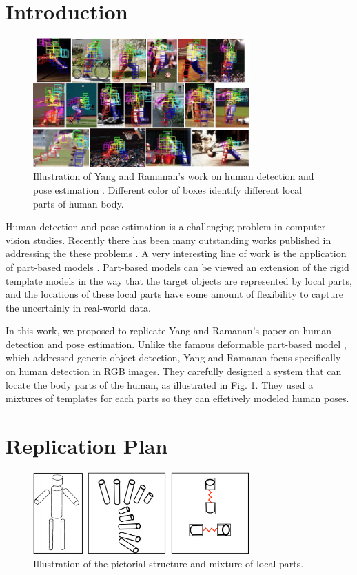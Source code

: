 \documentclass[10pt,twocolumn,letterpaper]{article}
\begin{document}
\section{Introduction}
\begin{figure}[t]
  \centering
  \includegraphics[width=8.3cm]{figure/parse_results.jpg}
  \caption{Illustration of Yang and Ramanan's work on human detection and pose estimation \cite{Yang_PAMI2011}. Different color of boxes identify different local parts of human body.}
\label{fig:intro}
\end{figure}
Human detection and pose estimation is a challenging problem in computer vision studies. Recently there has been many outstanding works published in addressing the these problems \cite{Bourdev_ICCV2009, Bourdev_ECCV2010, Felzenszwalb_PAMI2010, Yang_PAMI2011, Shotton_CVPR2011}. A very interesting line of work is the application of part-based models \cite{Felzenszwalb_PAMI2010, Yang_PAMI2011}. Part-based models can be viewed an extension of the rigid template models in the way that the target objects are represented by local parts, and the locations of these local parts have some amount of flexibility to capture the uncertainly in real-world data.

In this work, we proposed to replicate Yang and Ramanan's paper \cite{Yang_PAMI2011} on human detection and pose estimation. Unlike the famous deformable part-based model \cite{Felzenszwalb_PAMI2010}, which addressed generic object detection, Yang and Ramanan focus specifically on human detection in RGB images. They carefully designed a system that can locate the body parts of the human, as illustrated in Fig. \ref{fig:intro}. They used a mixtures of templates for each parts so they can effetively modeled human poses.

\section{Replication Plan}
\begin{figure}[t]
  \centering
  \includegraphics[width=8.3cm]{figure/pictorial.png}
  \caption{Illustration of the pictorial structure and mixture of local parts.}
\label{}
\end{figure}
\end{document}
